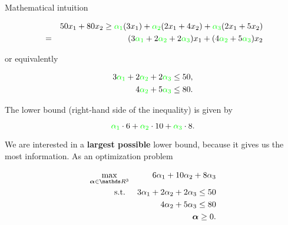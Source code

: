 \documentclass[11pt,compress,t,notes=noshow, xcolor=table]{beamer}
\begin{document}
\begin{vbframe}{Mathematical intuition}
%

\vspace*{-0.5cm}

\begin{eqnarray*}
&& 50x_1 + 80x_2 \ge \textcolor{green}{\alpha_1} (3x_1) + \textcolor{green}{\alpha_2} (2x_1 + 4x_2) + \textcolor{green}{\alpha_3} (2x_1 + 5x_2) \\ &=& (3 \textcolor{green}{\alpha_1} + 2  \textcolor{green}{\alpha_2} + 2 \textcolor{green}{\alpha_3}) x_1 + (4  \textcolor{green}{\alpha_2} + 5 \textcolor{green}{\alpha_3}) x_2
\end{eqnarray*}

or equivalently

\vspace*{-0.5cm}
\begin{eqnarray*}
3 \textcolor{green}{\alpha_1} + 2  \textcolor{green}{\alpha_2} + 2 \textcolor{green}{\alpha_3} \le 50, \\
4  \textcolor{green}{\alpha_2} + 5 \textcolor{green}{\alpha_3} \le 80.
\end{eqnarray*}

The lower bound (right-hand side of the inequality) is given by

$$
\textcolor{green}{\alpha_1} \cdot 6 + \textcolor{green}{\alpha_2} \cdot 10 + \textcolor{green}{\alpha_3} \cdot 8.
$$

\framebreak

We are interested in a \textbf{largest possible} lower bound, because it gives us the most information. As an optimization problem

\begin{eqnarray*}
\max_{\bm{\alpha} \in \R^3} && 6 \alpha_1 + 10 \alpha_2 + 8 \alpha_3 \\
\text{s.t. } && 3\alpha_1 + 2\alpha_2 + 2\alpha_3 \le 50 \\
&& 4\alpha_2 + 5\alpha_3 \le 80\\
&& \bm{\alpha} \ge 0.
\end{eqnarray*}


\end{vbframe}
\end{document}
